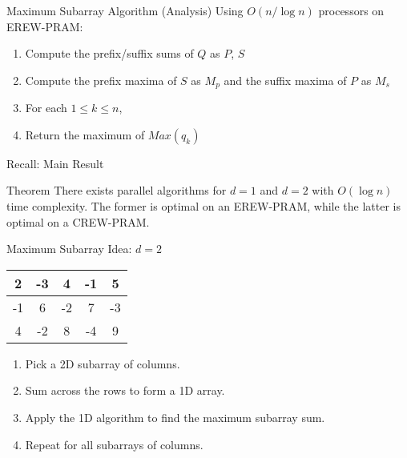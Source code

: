 \documentclass{beamer}
\newcommand{\fadetext}[1]{\textcolor{fade}{#1}}
\begin{document}
\begin{frame}{Maximum Subarray Algorithm (Analysis)}
  Using $O(n /\log n)$ processors on EREW-PRAM:
  \begin{enumerate}
    \item \fadetext{Compute the prefix/suffix sums of $Q$ as $P$, $S$} 
    \item \fadetext{Compute the prefix maxima of $S$ as $M_p$ and the suffix maxima of $P$ as $M_s$} 
    \item \fadetext{For each $1 \leq k \leq n$,}  
    \item \fadetext{Return the maximum of $Max(q_k)$} 
  \end{enumerate}

\end{frame}

\begin{frame}{Recall: Main Result}
  \begin{alertblock}{Theorem}
    There exists parallel algorithms for $d = 1$ and $d = 2$ with $O(\log n)$ time complexity. The former is optimal on an EREW-PRAM, while the latter is optimal on a CREW-PRAM.
  \end{alertblock}
\end{frame}

\beamerdefaultoverlayspecification{<+->}

\begin{frame}{Maximum Subarray Idea: $d = 2$}
\begin{table}[htbp]
  \centering
  \begin{tabular}{|c|c|c|c|c|}
  \hline
  2 & -3 & 4 & -1 & 5 \\
  \hline
  -1 & 6 & -2 & 7 & -3 \\
  \hline
  4 & -2 & 8 & -4 & 9 \\
  \hline
  \end{tabular}
\end{table}

\begin{enumerate}
  \item Pick a 2D subarray of columns.
  \item Sum across the rows to form a 1D array.
  \item Apply the 1D algorithm to find the maximum subarray sum.
  \item Repeat for all subarrays of columns.
\end{enumerate}
\end{frame}
\end{document}
